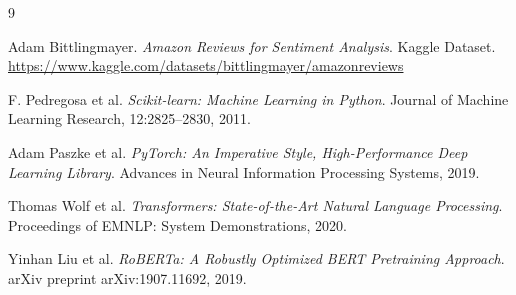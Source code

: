 \documentclass[conference]{IEEEtran}
\begin{document}
\begin{thebibliography}{9}

Adam Bittlingmayer.
\textit{Amazon Reviews for Sentiment Analysis}.
Kaggle Dataset.
\url{https://www.kaggle.com/datasets/bittlingmayer/amazonreviews}

F. Pedregosa et al.
\textit{Scikit-learn: Machine Learning in Python}.
Journal of Machine Learning Research, 12:2825--2830, 2011.

Adam Paszke et al.
\textit{PyTorch: An Imperative Style, High-Performance Deep Learning Library}.
Advances in Neural Information Processing Systems, 2019.

Thomas Wolf et al.
\textit{Transformers: State-of-the-Art Natural Language Processing}.
Proceedings of EMNLP: System Demonstrations, 2020.

Yinhan Liu et al.
\textit{RoBERTa: A Robustly Optimized BERT Pretraining Approach}.
arXiv preprint arXiv:1907.11692, 2019.

\end{thebibliography}

\balance
\end{document}
